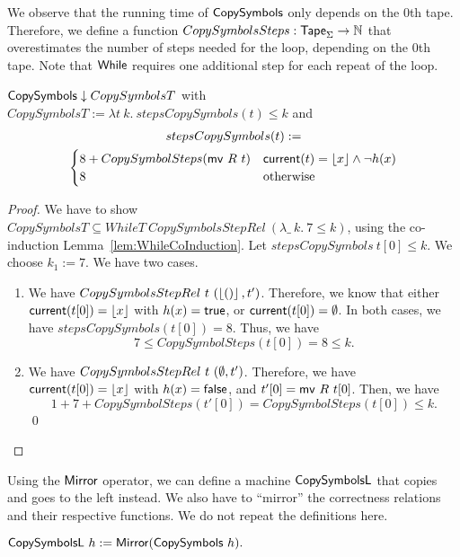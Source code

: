 We observe that the running time of $\mathsf{CopySymbols}$ only depends on the $0$th tape.  Therefore, we define a function
$CopySymbolsSteps : \mathsf{Tape}_\Sigma \rightarrow \mathbb{N}$ that overestimates the number of steps needed for the loop, depending on the $0$th tape.  Note that
$\mathsf{While}$ requires one additional step for each repeat of the loop.
\begin{lemma}
  $\mathsf{CopySymbols} \mathrel{\downarrow} CopySymbolsT$ with \\
  $CopySymbolsT := \lambda t~k.~stepsCopySymbols(t) \leq k$ and
  \begin{multline*}
    stepsCopySymbols (t) := \\
    \begin{cases}
      8 + CopySymbolSteps(\mathsf{mv}~R~t) & \mathsf{current}(t)=\left\lfloor {x} \right\rfloor \land \lnot h(x) \\
      8                                & \text{otherwise}
    \end{cases}
  \end{multline*}
\end{lemma}
\begin{proof}
  We have to show $CopySymbolsT \subseteq WhileT~CopySymbolsStepRel~(\lambda \_~k.~7 \leq k)$, using the co-induction
  Lemma~\ref{lem:WhileCoInduction}.  Let $stepsCopySymbols~t[0] \leq k$.  We choose $k_1 := 7$.  We have two cases.
  \begin{enumerate}
  \item We have $CopySymbolsStepRel~t~(\left\lfloor {\ensuremath{\mathsf{()}}} \right\rfloor, t')$.  Therefore, we know that either $\mathsf{current}(t[0])=\left\lfloor {x} \right\rfloor$ with $h(x)=\mathsf{true}$, or
    $\mathsf{current}(t[0])=\emptyset$.  In both cases, we have $stepsCopySymbols(t[0]) = 8$.  Thus, we have
    $$ 7 \leq CopySymbolSteps(t[0]) = 8 \leq k. $$
  \item We have $CopySymbolsStepRel~t~(\emptyset, t')$.  Therefore, we have $\mathsf{current}(t[0])=\left\lfloor {x} \right\rfloor$ with $h(x)=\mathsf{false}$, and $t'[0]=\mathsf{mv}~R~t[0]$.
    Then, we have
    $$ 1+7+CopySymbolSteps(t'[0]) = CopySymbolSteps(t[0]) \leq k.$$
    \qed
  \end{enumerate}
\end{proof}

Using the $\mathsf{Mirror}$ operator, we can define a machine $\MS{CopySymbolsL}$ that copies and goes to the left instead.  We also have to ``mirror''
the correctness relations and their respective functions.  We do not repeat the definitions here.
\begin{definition}[$\MS{CopySymbolsL}$][CopySymbols_L]
  $\mathsf{CopySymbolsL}~h := \mathsf{Mirror}(\mathsf{CopySymbols}~h).$
\end{definition}


